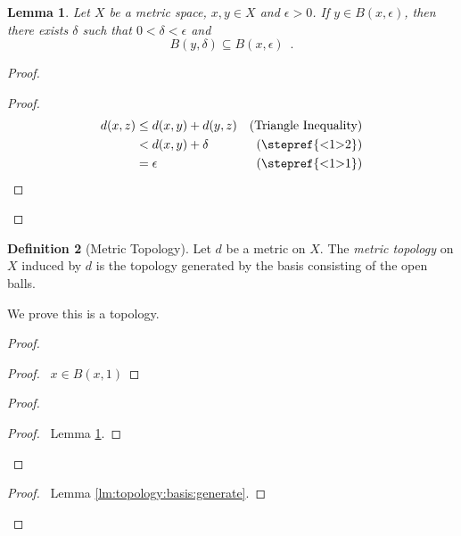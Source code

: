 \documentclass{report}
\let\qed\relax
\newtheorem{lm}{Lemma}[section]
\theoremstyle{definition}
\newtheorem{df}[lm]{Definition}
\begin{document}
  \begin{lm}
    \label{lm:topology:metric:balls}
    Let $X$ be a metric space, $x, y \in X$ and $\epsilon > 0$. If $y \in B(x,
    \epsilon)$, then there exists $\delta$ such that $0 < \delta < \epsilon$ and
    \[ B(y, \delta) \subseteq B(x, \epsilon) \enspace . \]
  \end{lm}

  \begin{proof}
    \pf
    \begin{proof}
      \pf
      \begin{align*}
        d(x, z) & \leq d(x, y) + d(y, z) & (\text{Triangle Inequality}) \\
        & < d(x, y) + \delta & (\text{\stepref{<1>2}}) \\
        & = \epsilon & (\text{\stepref{<1>1}})
      \end{align*}
    \end{proof}
    \qed
  \end{proof}

  \begin{df}[Metric Topology]
    Let $d$ be a metric on $X$. The \emph{metric topology} on $X$ induced by
    $d$ is the topology generated by the basis consisting of the open balls.

    We prove this is a topology.
  \end{df}

  \begin{proof}
    \pf
    \begin{proof}
      \pf\ $x \in B(x, 1)$
    \end{proof}
    \begin{proof}
      \begin{proof}
        \pf\ Lemma \ref{lm:topology:metric:balls}.
      \end{proof}
    \end{proof}
    \qedstep
    \begin{proof}
      \pf\ Lemma \ref{lm:topology:basis:generate}.
    \end{proof}
  \end{proof}
\end{document}
